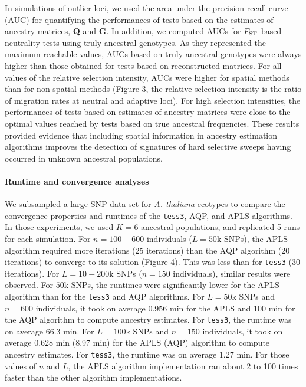 In simulations of outlier loci, we used the area under the precision-recall curve (AUC) for quantifying the performances of tests based on the estimates of ancestry matrices, {\bf Q} and {\bf G}. In addition, we computed AUCs for $F_{\rm ST}$-based neutrality tests using truly ancestral genotypes. As they represented the maximum reachable values, AUCs based on truly ancestral genotypes were always higher than those obtained for tests based on reconstructed matrices. For all values of the relative  selection intensity, AUCs were higher for spatial methods than for non-spatial methods (Figure 3, the relative selection intensity is the ratio of migration rates at neutral and adaptive loci). For high selection intensities, the performances of tests based on estimates of ancestry matrices were close to the optimal values reached  by tests based on true ancestral frequencies. These results provided evidence that including spatial information in ancestry estimation algorithms improves the detection of signatures of hard selective sweeps having occurred in unknown ancestral populations. 

\paragraph{Runtime and convergence analyses} We subsampled a large SNP data set for {\it A. thaliana} ecotypes  to compare the convergence properties and runtimes of the {\tt tess3}, AQP, and APLS algorithms. In those experiments, we used $K = 6$ ancestral populations, and replicated 5 runs for each simulation. For $n = 100-600$ individuals ($L = 50$k SNPs), the APLS algorithm required more iterations (25 iterations)  than the AQP algorithm (20 iterations) to converge to its solution  (Figure 4). This was less than for {\tt tess3} (30 iterations).  For $L = 10-200$k SNPs ($n = 150$ individuals), similar results were observed. For $50$k SNPs, the runtimes were significantly lower for the APLS algorithm than for the {\tt tess3} and AQP algorithms. For $L = 50$k SNPs and $n = 600$ individuals, it took on average 0.956 min for the APLS and 100 min for the AQP algorithm to compute ancestry estimates. For {\tt tess3}, the runtime was on average 66.3 min. For $L = 100$k SNPs and $n = 150$ individuals, it took on average 0.628 min (8.97 min) for the APLS (AQP) algorithm to compute ancestry estimates. For {\tt tess3}, the runtime was on average 1.27 min.  For those values of $n$ and $L$, the APLS algorithm implementation ran about 2 to 100 times faster than the other algorithm implementations.
 
